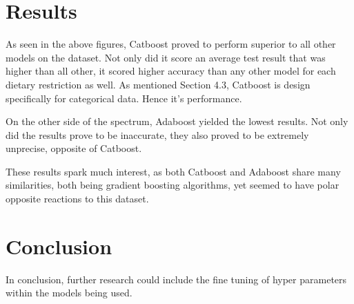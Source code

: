 \documentclass[twocolumn]{article}
\begin{document}
\section{Results}
As seen in the above figures, Catboost proved to perform superior to all other models on the dataset. Not only did it score an average test result that was higher than all other, it scored higher accuracy than any other model for each dietary restriction as well. As mentioned Section 4.3, Catboost is design specifically for categorical data. Hence it's performance.

On the other side of the spectrum, Adaboost yielded the lowest results. Not only did the results prove to be inaccurate, they also proved to be extremely unprecise, opposite of Catboost.

These results spark much interest, as both Catboost and Adaboost share many similarities, both being gradient boosting algorithms, yet seemed to have polar opposite reactions to this dataset. 
\section{Conclusion}
In conclusion, further research could include the fine tuning of hyper parameters within the models being used. 















%
%
%




\end{document}
